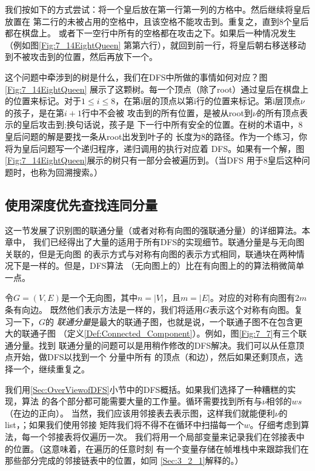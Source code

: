 \begin{example}
\begin{figure*}[!t]
\begin{tikzpicture}
    \end{tikzpicture}
    \caption{8皇后问题}
    \label{Fig:7_14EightQueen}
\end{figure*}

我们按如下的方式尝试：将一个皇后放在第一行第一列的方格中。然后继续将皇后放置在
第二行的未被占用的空格中，且该空格不能攻击到。重复之，直到8个皇后都在棋盘上。
或者下一空行中所有的空格都在攻击之下。如果后一种情况发生（例如图\ref{Fig:7_14EightQueen}
第第六行），就回到前一行，将皇后朝右移送移动到不被攻击到的位置，然后再放下一个。

这个问题中牵涉到的树是什么，我们在DFS中所做的事情如何对应？图\ref{Fig:7_14EightQueen}
展示了这颗树。每一个顶点（除了root）通过皇后在棋盘上的位置来标记。对于$1\leq
i \leq
8$，在第i层的顶点以第i行的位置来标记。第i层顶点$\nu$的孩子，是在第$i+1$行中不会被
攻击到的所有位置，是被从root到$\nu$的所有顶点表示的皇后攻击到;换句话说，孩子是
下一行中所有安全的位置。在树的术语中，8皇后问题的解是要找一条从root出发到叶子的
长度为8的路径。作为一个练习，你将为皇后问题写一个递归程序，递归调用的执行对应着
DFS。如果有一个解，图\ref{Fig:7_14EightQueen}展示的树只有一部分会被遍历到。（当DFS
用于8皇后这种问题时，也称为回溯搜索。）
\end{example}

\subsection{使用深度优先查找连同分量}\label{Sec:DFSOnUndirectedGraphs}
这一节发展了识别图的联通分量（或者对称有向图的强联通分量）的详细算法。本章中，
我们已经得出了大量的适用于所有DFS的实现细节。联通分量是与无向图关联的，但是无向图
的表示方式与对称有向图的表示方式相同，联通块在两种情况下是一样的。但是，DFS算法
（无向图上的）比在有向图上的的算法稍微简单一点。

令$G=(V,E)$是一个无向图，其中$n=|V|$，且$m=|E|$。对应的对称有向图有$2m$条有向边。
既然他们表示方法是一样的，我们将适用$G$表示这个对称有向图。复习一下，$G$的
\emph{联通分量}是最大的联通子图，也就是说，一个联通子图不在包含更大的联通子图
（定义\ref{Def:Connected_Component}）。例如，图\ref{Fig:7_7}有三个联通分量。找到
联通分量的问题可以是用稍作修改的DFS解决。我们可以从任意顶点开始，做DFS以找到一个
分量中所有 的顶点（和边），然后如果还剩顶点，选择一个，继续重复之。

我们用\ref{Sec:OverViewofDFS}小节中的DFS概括。如果我们选择了一种糟糕的实现，算法
的各个部分都可能需要大量的工作量。循环需要找到所有与$\nu$相邻的$ws$（在边的正向）。
当然，我们应该用邻接表去表示图，这样我们就能便利$\nu$的list，；如果我们使用邻接
矩阵我们将不得不在循环中扫描每一个$w$。仔细考虑到算法，每一个邻接表将仅遍历一次。
我们将用一个局部变量来记录我们在邻接表中的位置。（这意味着，在遍历的任意时刻
有一个变量存储在帧堆栈中来跟踪我们在那些部分完成的邻接链表中的位置，如同
\ref{Sec:3_2_1}解释的。）

